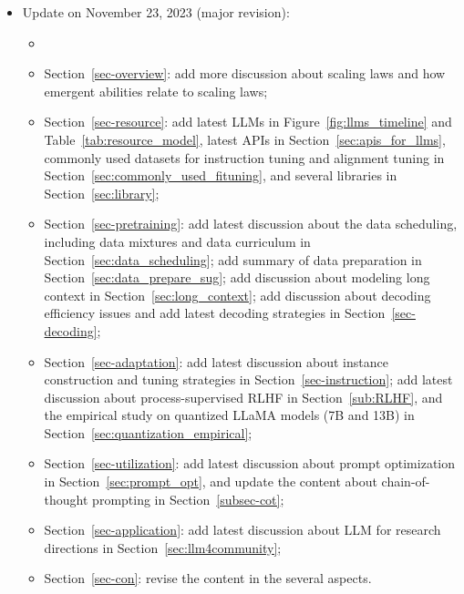 {\begin{itemize}
\begin{itemize}
\item  {Section~\ref{subsec:promptdesign}: add new prompt examples in Table~\ref{tab-tips};}

\end{itemize}

\item {Update on November 23, 2023 (major revision): }
\begin{itemize}
    \item \item 
    {Section~\ref{sec-overview}: add more discussion about scaling laws and how emergent abilities relate to scaling laws;}
    \item {Section~\ref{sec-resource}: add latest LLMs in Figure~\ref{fig:llms_timeline} and Table~\ref{tab:resource_model}, latest APIs in Section~\ref{sec:apis_for_llms}, commonly used datasets for instruction tuning and alignment tuning in Section~\ref{sec:commonly_used_fituning}, and several libraries in Section~\ref{sec:library};}
    \item {Section~\ref{sec-pretraining}: add latest discussion about the data scheduling, including data mixtures and data curriculum in Section~\ref{sec:data_scheduling}; add summary of data preparation in Section~\ref{sec:data_prepare_sug}; add discussion about modeling long context in Section~\ref{sec:long_context}; add discussion about decoding efficiency issues and add latest decoding strategies in Section~\ref{sec-decoding};}
    \item {Section~\ref{sec-adaptation}: add latest discussion about instance construction and tuning strategies in Section~\ref{sec-instruction}; add latest discussion about process-supervised RLHF in Section~\ref{sub:RLHF}, and the empirical study on quantized LLaMA models (7B and 13B) in Section~\ref{sec:quantization_empirical};}
    \item {Section~\ref{sec-utilization}: add latest discussion about prompt optimization in Section~\ref{sec:prompt_opt}, and update the content about chain-of-thought prompting in Section~\ref{subsec-cot};}
    \item {Section~\ref{sec-application}: add latest discussion about LLM for research directions in Section~\ref{sec:llm4community};}
    \item {Section~\ref{sec-con}: revise the content in the several aspects.}
\end{itemize}


\end{itemize}}
